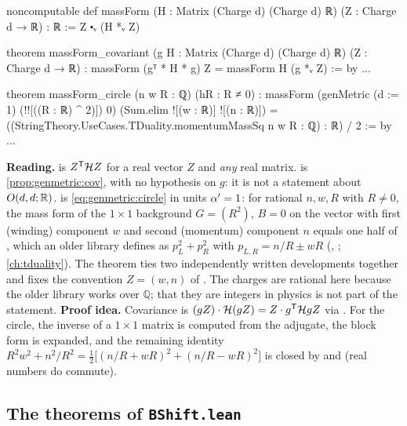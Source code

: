 \begin{leanbox}
\begin{leancode}
noncomputable def massForm (H : Matrix (Charge d) (Charge d) ℝ)
    (Z : Charge d → ℝ) : ℝ :=
  Z ⬝ᵥ (H *ᵥ Z)

theorem massForm_covariant (g H : Matrix (Charge d) (Charge d) ℝ)
    (Z : Charge d → ℝ) :
    massForm (gᵀ * H * g) Z = massForm H (g *ᵥ Z) := by ...

theorem massForm_circle (n w R : ℚ) (hR : R ≠ 0) :
    massForm (genMetric (d := 1) (!![((R : ℝ) ^ 2)]) 0)
        (Sum.elim ![(w : ℝ)] ![(n : ℝ)]) =
      ((StringTheory.UseCases.TDuality.momentumMassSq n w R : ℚ) : ℝ) / 2
    := by ...
\end{leancode}
\textbf{Reading.}  is $Z^{\mathsf T}\mathcal{H} Z$ for a real vector $Z$ and
\emph{any} real matrix.  is \cref{prop:genmetric:cov}, with no
hypothesis on $g$: it is not a statement about $O(d,d;\mathbb{R})$.  is
\eqref{eq:genmetric:circle} in units $\alpha'=1$: for rational $n,w,R$ with $R\ne0$, the mass
form of the $1\times1$ background $G=(R^2)$, $B=0$ on the vector with first (winding)
component $w$ and second (momentum) component $n$ equals one half of
, which an older library defines as $p_L^2+p_R^2$ with
$p_{L,R}=n/R\pm wR$ (, ; \cref{ch:tduality}). The
theorem ties two independently written developments together and fixes the convention
$Z=(w,n)$ of . The charges are rational here because the older library
works over $\mathbb Q$; that they are integers in physics is not part of the statement.
\textbf{Proof idea.} Covariance is $(gZ)\cdot\mathcal{H}(gZ)=Z\cdot g^{\mathsf T}\mathcal{H} gZ$ via
. For the circle, the inverse of a $1\times1$
matrix is computed from the adjugate, the block form is expanded, and the remaining
identity $R^2w^2+n^2/R^2=\frac12\big[(n/R+wR)^2+(n/R-wR)^2\big]$ is closed by
 and  (real numbers do commute).
\end{leanbox}

\subsection{The theorems of \texttt{BShift.lean}}


